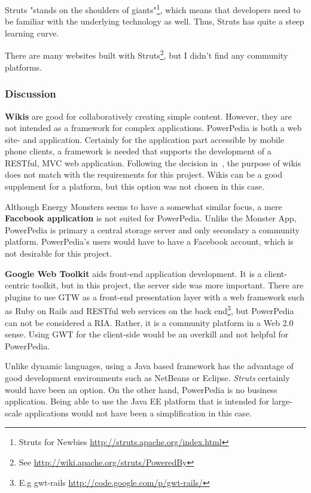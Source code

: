 Struts "stands on the shoulders of giants"\footnote{Struts for Newbies \url{http://struts.apache.org/index.html}}, which means that developers need to be familiar with the underlying technology as well. Thus, Struts has quite a steep learning curve. 

There are many websites built with Struts\footnote{See \url{http://wiki.apache.org/struts/PoweredBy}}, but I didn't find any community platforms. 

\subsubsection{Discussion}
\textbf{Wikis} are good for collaboratively creating simple content. However, they are not intended as a framework for complex applications. PowerPedia is both a web site- and application. Certainly for the application part accessible by mobile phone clients, a framework is needed that supports the development of a RESTful, MVC web application. Following the decision in~\cite{merklepp}, the purpose of wikis does not match with the requirements for this project. 
Wikis can be a good supplement for a platform, but this option was not chosen in this case.

Although Energy Monsters seems to have a somewhat similar focus, a mere \textbf{Facebook application} is not suited for PowerPedia. Unlike the Monster App, PowerPedia is primary a central storage server and only secondary a community platform. PowerPedia's users would have to have a Facebook account, which is not desirable for this project. 

\textbf{Google Web Toolkit} aids front-end application development. It is a client-centric toolkit, but in this project, the server side was more important. 
There are plugins to use GTW as a front-end presentation layer with a web framework such as Ruby on Rails and RESTful web services on the back end\footnote{E.g gwt-rails \url{http://code.google.com/p/gwt-rails/}}, but PowerPedia can not be considered a RIA. Rather, it is a community platform in a Web 2.0 sense. Using GWT for the client-side would be an overkill and not helpful for PowerPedia. 

Unlike dynamic languages, using a Java based framework has the advantage of good development environments such as NetBeans or Eclipse. \textit{Struts} certainly would have been an option. On the other hand, PowerPedia is no business application. Being able to use the Java EE platform that is intended for large-scale applications would not have been a simplification in this case.  


